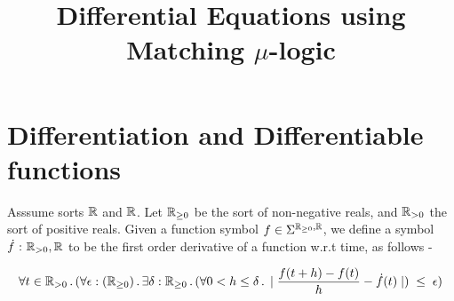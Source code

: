 \documentclass[]{article}
\title{Differential Equations using Matching $\mu$-logic}
\newcommand{\SortR}{S_{\R \rightarrow \R}}
\newcommand{\differential}{\textit{differential}}
\begin{document}
\maketitle

\section{Differentiation and Differentiable functions}

Asssume sorts $\mathbb{R}$ and $\mathbb{R}$. Let $\mathbb{R}_{\geq 0}$ be the sort of non-negative
reals, and $\mathbb{R}_{> 0}$ the sort of positive reals.
Given a function symbol $f \in \Sigma^{\mathbb{R}_{\geq 0}, \mathbb{R}}$,
we define a symbol $\dot{f} \ \mathord{:} \ \mathbb{R}_{> 0}, \mathbb{R}$ to be the first
order derivative of a function w.r.t time, as follows -


$$ \forall t \in \mathbb{R}_{> 0} \,\mathord{.}\, (\forall \epsilon : (\mathbb{R}_{\geq 0}) \,\mathord{.}\, \exists \delta :
\mathbb{R}_{\geq 0} \,\mathord{.}\, (\forall 0 < h \leq \delta \,\mathord{.}\, \mid \frac{f(t + h) -f(t)}{h} -
\dot{f}(t) \mid ) \; \leq \; \epsilon) $$



%
%
%
%
%
%
\end{document}
